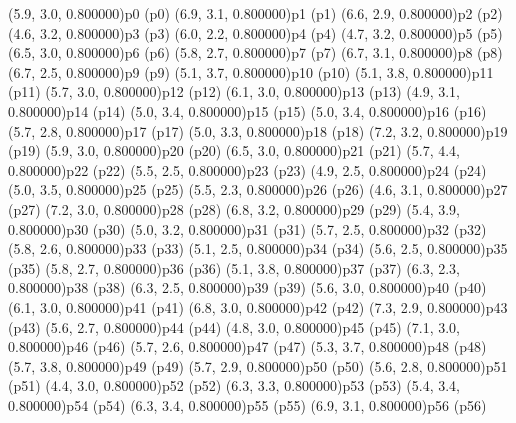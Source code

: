 \psPoint(5.9, 3.0, 0.800000){p0}
\psdot(p0)
\psPoint(6.9, 3.1, 0.800000){p1}
\psdot(p1)
\psPoint(6.6, 2.9, 0.800000){p2}
\psdot(p2)
\psPoint(4.6, 3.2, 0.800000){p3}
\psdot(p3)
\psPoint(6.0, 2.2, 0.800000){p4}
\psdot(p4)
\psPoint(4.7, 3.2, 0.800000){p5}
\psdot(p5)
\psPoint(6.5, 3.0, 0.800000){p6}
\psdot(p6)
\psPoint(5.8, 2.7, 0.800000){p7}
\psdot(p7)
\psPoint(6.7, 3.1, 0.800000){p8}
\psdot(p8)
\psPoint(6.7, 2.5, 0.800000){p9}
\psdot(p9)
\psPoint(5.1, 3.7, 0.800000){p10}
\psdot(p10)
\psPoint(5.1, 3.8, 0.800000){p11}
\psdot(p11)
\psPoint(5.7, 3.0, 0.800000){p12}
\psdot(p12)
\psPoint(6.1, 3.0, 0.800000){p13}
\psdot(p13)
\psPoint(4.9, 3.1, 0.800000){p14}
\psdot(p14)
\psPoint(5.0, 3.4, 0.800000){p15}
\psdot(p15)
\psPoint(5.0, 3.4, 0.800000){p16}
\psdot(p16)
\psPoint(5.7, 2.8, 0.800000){p17}
\psdot(p17)
\psPoint(5.0, 3.3, 0.800000){p18}
\psdot(p18)
\psPoint(7.2, 3.2, 0.800000){p19}
\psdot(p19)
\psPoint(5.9, 3.0, 0.800000){p20}
\psdot(p20)
\psPoint(6.5, 3.0, 0.800000){p21}
\psdot(p21)
\psPoint(5.7, 4.4, 0.800000){p22}
\psdot(p22)
\psPoint(5.5, 2.5, 0.800000){p23}
\psdot(p23)
\psPoint(4.9, 2.5, 0.800000){p24}
\psdot(p24)
\psPoint(5.0, 3.5, 0.800000){p25}
\psdot(p25)
\psPoint(5.5, 2.3, 0.800000){p26}
\psdot(p26)
\psPoint(4.6, 3.1, 0.800000){p27}
\psdot(p27)
\psPoint(7.2, 3.0, 0.800000){p28}
\psdot(p28)
\psPoint(6.8, 3.2, 0.800000){p29}
\psdot(p29)
\psPoint(5.4, 3.9, 0.800000){p30}
\psdot(p30)
\psPoint(5.0, 3.2, 0.800000){p31}
\psdot(p31)
\psPoint(5.7, 2.5, 0.800000){p32}
\psdot(p32)
\psPoint(5.8, 2.6, 0.800000){p33}
\psdot(p33)
\psPoint(5.1, 2.5, 0.800000){p34}
\psdot(p34)
\psPoint(5.6, 2.5, 0.800000){p35}
\psdot(p35)
\psPoint(5.8, 2.7, 0.800000){p36}
\psdot(p36)
\psPoint(5.1, 3.8, 0.800000){p37}
\psdot(p37)
\psPoint(6.3, 2.3, 0.800000){p38}
\psdot(p38)
\psPoint(6.3, 2.5, 0.800000){p39}
\psdot(p39)
\psPoint(5.6, 3.0, 0.800000){p40}
\psdot(p40)
\psPoint(6.1, 3.0, 0.800000){p41}
\psdot(p41)
\psPoint(6.8, 3.0, 0.800000){p42}
\psdot(p42)
\psPoint(7.3, 2.9, 0.800000){p43}
\psdot(p43)
\psPoint(5.6, 2.7, 0.800000){p44}
\psdot(p44)
\psPoint(4.8, 3.0, 0.800000){p45}
\psdot(p45)
\psPoint(7.1, 3.0, 0.800000){p46}
\psdot(p46)
\psPoint(5.7, 2.6, 0.800000){p47}
\psdot(p47)
\psPoint(5.3, 3.7, 0.800000){p48}
\psdot(p48)
\psPoint(5.7, 3.8, 0.800000){p49}
\psdot(p49)
\psPoint(5.7, 2.9, 0.800000){p50}
\psdot(p50)
\psPoint(5.6, 2.8, 0.800000){p51}
\psdot(p51)
\psPoint(4.4, 3.0, 0.800000){p52}
\psdot(p52)
\psPoint(6.3, 3.3, 0.800000){p53}
\psdot(p53)
\psPoint(5.4, 3.4, 0.800000){p54}
\psdot(p54)
\psPoint(6.3, 3.4, 0.800000){p55}
\psdot(p55)
\psPoint(6.9, 3.1, 0.800000){p56}
\psdot(p56)
